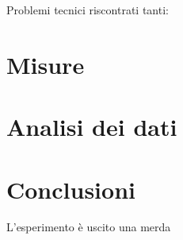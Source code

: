 \documentclass{article}
\begin{document}
Problemi tecnici riscontrati tanti: 

\section{Misure}

\section{Analisi dei dati}

\section{Conclusioni}
L'esperimento è uscito una merda

\section{}
\end{document}
